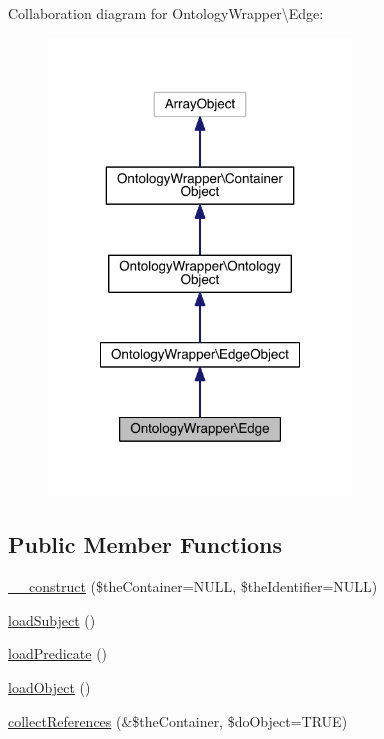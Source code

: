 Collaboration diagram for Ontology\-Wrapper\textbackslash{}Edge\-:\nopagebreak
\begin{figure}[H]
\begin{center}
\leavevmode
\includegraphics[width=228pt]{class_ontology_wrapper_1_1_edge__coll__graph}
\end{center}
\end{figure}
\subsection*{Public Member Functions}
\begin{DoxyCompactItemize}
\item 
\hyperlink{class_ontology_wrapper_1_1_edge_ae3ae5e6b59244535718879a98e4b16d3}{\-\_\-\-\_\-construct} (\$the\-Container=N\-U\-L\-L, \$the\-Identifier=N\-U\-L\-L)
\item 
\hyperlink{class_ontology_wrapper_1_1_edge_acd4c7e465ef4a809580d6ad8d19dd7ab}{load\-Subject} ()
\item 
\hyperlink{class_ontology_wrapper_1_1_edge_ab4ec3c0a5b1b89632c20c5d807e13da9}{load\-Predicate} ()
\item 
\hyperlink{class_ontology_wrapper_1_1_edge_ac0176e2db533a781fb59c60368e3f5e4}{load\-Object} ()
\item 
\hyperlink{class_ontology_wrapper_1_1_edge_aaf586277ed281c7303c4f7fafec2b7ac}{collect\-References} (\&\$the\-Container, \$do\-Object=T\-R\-U\-E)
\end{DoxyCompactItemize}
